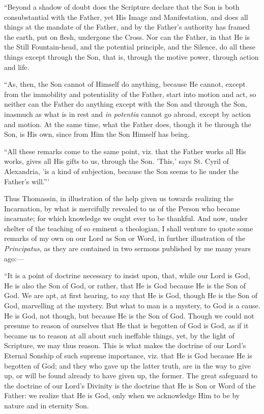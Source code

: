 ``Beyond a shadow of doubt does the Scripture declare that the
Son is both consubstantial with the Father, yet His Image and
Manifestation, and does all things at the mandate of the Father, and
by the Father's authority has framed the earth, put on flesh,
undergone the Cross. Nor can the Father, in that He is the Still
Fountain-head, and the potential principle, and the Silence, do
all these things except through the Son, that is, through the motive
power, through action and life.

``As, then, the Son cannot of Himself do anything, because He
cannot, except from the immobility and potentiality of the Father,
start into motion and act, so neither can the Father do anything
except with the Son and through the Son, inasmuch as what is in rest
and \emph{in potentia} cannot go abroad, except by action and motion.
At the same time, what the Father does, though it be through the Son,
is His own, since from Him the Son Himself has being.

``All these remarks come to the same point, viz. that the
Father works all His works, gives all His gifts to us, through the
Son. 'This,' says St. Cyril of Alexandria, 'is a kind of subjection,
because the Son seems to lie under the Father's will.'''

Thus Thomassin, in illustration of the help given us towards
realizing the Incarnation, by what is mercifully revealed to us of the
Person who became incarnate; for which knowledge we ought ever to be
thankful. And now, under shelter of the teaching of so eminent a
theologian, I shall venture to quote some remarks of my own on our
Lord as Son or Word, in further illustration of the \emph{Principatus},
as they are contained in two sermons published by me many years ago:—

``It is a point of doctrine necessary to insist upon, that,
while our Lord is God, He is also the Son of God, or rather, that He
is God because He is the Son of God. We are apt, at first hearing, to
say that He is God, though He is the Son of God, marvelling at
the mystery. But what to man is a mystery, to God is a cause. He is
God, not though, but because He is the Son of God. Though we could not
presume to reason of ourselves that He that is begotten of God is God,
as if it became us to reason at all about such ineffable things, yet,
by the light of Scripture, we may thus reason. This is what makes the
doctrine of our Lord's Eternal Sonship of such supreme importance,
viz. that He is God because He is begotten of God; and they who gave
up the latter truth, are in the way to give up, or will be found
already to have given up, the former. The great safeguard to the
doctrine of our Lord's Divinity is the doctrine that He is Son or Word
of the Father: we realize that He is God, only when we acknowledge Him
to be by nature and in eternity Son.

